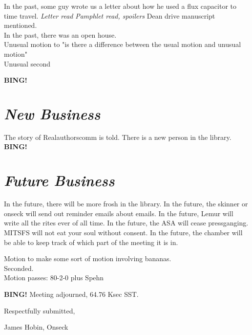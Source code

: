 \documentclass[10pt]{article}
\newcommand{\bing}{{\bf BING!} }
\newcommand{\goto}[1]{\bing \vskip 12pt \section*{{\em{#1}}}}
\newcommand{\ps}{ plus Spehn\xspace}
\newcommand{\onseck}{James Hobin, Onseck}
\begin{document}
In the past, some guy wrote us a letter about how he used a flux capacitor to time travel.
{\em Letter read}
{\em Pamphlet read, spoilers}
Dean drive manuscript mentioned. \\
In the past, there was an open house. \\
Unusual motion to "is there a difference between the usual motion and unusual motion" \\
Unusual second

\goto{New Business}
The story of Realauthorscomm is told.
There is a new person in the library.
\goto{Future Business}
In the future, there will be more frosh in the library.
In the future, the skinner or onseck will send out reminder emails about emails.
In the future, Lemur will write all the rites ever of all time.
In the future, the ASA will cease pressganging.
MITSFS will not eat your soul without consent.
In the future, the chamber will be able to keep track of which part of the meeting it is in.

Motion to make some sort of motion involving bananas. \\
Seconded. \\
Motion passes: 80-2-0 \ps

\bing
\noindent
Meeting adjourned, 64.76 Ksec SST.

\vspace{18pt}

\centerline{Respectfully submitted,}
\centerline{\onseck}
\end{document}
